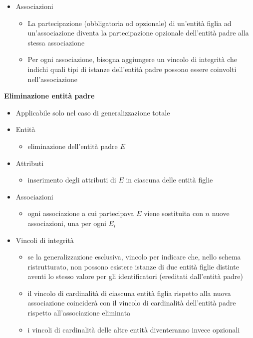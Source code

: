 \begin{itemize}
    \item Associazioni
    \begin{itemize}
        \item La partecipazione (obbligatoria od opzionale) di un'entità figlia ad un'associazione diventa la partecipazione opzionale dell'entità padre alla stessa associazione
        \item Per ogni associazione, bisogna aggiungere un vincolo di integrità che indichi quali tipi di istanze dell'entità padre possono essere coinvolti nell'associazione
    \end{itemize}
\end{itemize}
\vspace{2mm} \noindent
\textbf{Eliminazione entità padre}
\begin{itemize}
    \item Applicabile solo nel caso di generalizzazione totale
    
    \item Entità
    \begin{itemize}
        \item eliminazione dell'entità padre $E$
    \end{itemize}
    
    \item Attributi
    \begin{itemize}
        \item inserimento degli attributi di $E$ in ciascuna delle entità figlie
    \end{itemize}

    \item Associazioni
    \begin{itemize}
        \item ogni associazione a cui partecipava $E$ viene sostituita con $n$ nuove associazioni, una per ogni $E_i$
    \end{itemize}

    \item Vincoli di integrità
    \begin{itemize}
        \item se la generalizzazione esclusiva, vincolo per indicare che, nello schema ristrutturato, non possono esistere istanze di due entità figlie distinte aventi lo stesso valore per gli identificatori (ereditati dall'entità padre)
        \item il vincolo di cardinalità di ciascuna entità figlia rispetto alla nuova associazione coinciderà con il vincolo di cardinalità dell'entità padre rispetto all'associazione eliminata
        \item i vincoli di cardinalità delle altre entità diventeranno invece opzionali
    \end{itemize}
\end{itemize}

